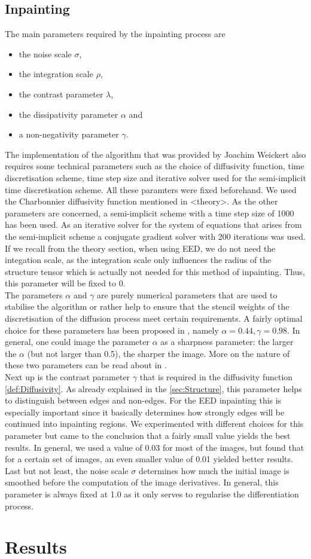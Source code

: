 \subsection{Inpainting}
The main parameters required by the inpainting process are 
\begin{itemize}
    \item the noise scale $\sigma$,
    \item the integration scale $\rho$,
    \item the contrast parameter $\lambda$, 
    \item the dissipativity parameter $\alpha$ and
    \item a non-negativity parameter $\gamma$.
\end{itemize}
The implementation of the algorithm that was provided by Joachim Weickert also requires some
technical parameters such as the choice of diffusivity function, time discretisation scheme, time
step size and iterative solver used for the semi-implicit time discretisation scheme.
 All these paramters were fixed beforehand. We used the Charbonnier diffusivity function mentioned
 in <theory>. As the other parameters are concerned, a semi-implicit scheme with a time step size
 of 1000 has been used. As an iterative solver for the system of equations that arises from the
 semi-implicit scheme a conjugate gradient solver with 200 iterations was used.
\\
If we recall from the theory section, when using EED, we do not need the integation scale, as the
integration scale only influences the radius of the structure tensor which is actually not needed
for this method of inpainting. Thus, this parameter will be fixed to 0.\\
The parameters $\alpha$ and $\gamma$ are purely numerical parameters that are used to 
stabilise the algorithm or rather help to ensure that the stencil weights of the discretisation of
the diffusion process meet certain requirements. A fairly optimal choice for these parameters has
been proposed in \cite{www13}, namely $\alpha=0.44, \gamma=0.98$.
In general, one could image the parameter $\alpha$ as a sharpness parameter: the larger the
$\alpha$ (but not larger than 0.5), the sharper the image. More on the nature of these two parameters can be read about in
\cite{www13, weickert96}.\\
Next up is the contrast parameter $\gamma$ that is required in the diffusivity function
\eqref{def:Diffusivity}. As already explained in the \ref{sec:Structure}, this parameter helps to
distinguish between edges and non-edges. For the EED inpainting this is especially important since
it basically determines how strongly edges will be continued into inpainting regions. We
experimented with different choices for this parameter but came to the conclusion that a fairly
small value yields the best results. In general, we used a value of 0.03 for most of the images,
but found that for a certain set of images, an even smaller value of 0.01 yielded better results.\\
Last but not least, the noise scale $\sigma$ determines how much the initial image is smoothed
before the computation of the image derivatives. In general, this parameter is always fixed at 1.0
as it only serves to regularise the differentiation process.
\section{Results}\label{sec:Results}
